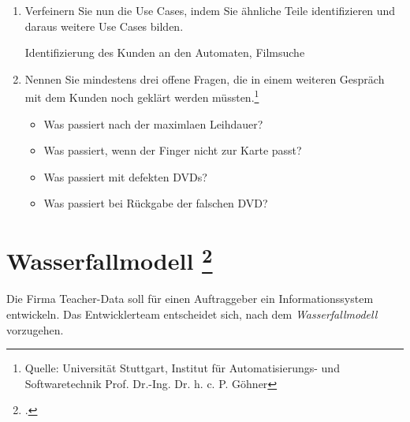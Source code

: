 \documentclass{lehramt-informatik-aufgabe}
\begin{document}
\begin{enumerate}

\item Verfeinern Sie nun die Use Cases, indem Sie ähnliche Teile
identifizieren und daraus weitere Use Cases bilden.

\begin{liAntwort}
Identifizierung des Kunden an den Automaten, Filmsuche
\end{liAntwort}


\item Nennen Sie mindestens drei offene Fragen, die in einem weiteren
Gespräch mit dem Kunden noch geklärt werden müssten.\footnote{Quelle:
Universität Stuttgart, Institut für Automatisierungs- und
Softwaretechnik Prof. Dr.-Ing. Dr. h. c. P. Göhner}

\begin{liAntwort}
\begin{itemize}
\item Was passiert nach der maximlaen Leihdauer?
\item Was passiert, wenn der Finger nicht zur Karte passt?
\item Was passiert mit defekten DVDs?
\item Was passiert bei Rückgabe der falschen DVD?
\end{itemize}
\end{liAntwort}
\end{enumerate}

%

\section{Wasserfallmodell
\footcite[Seite 1]{sosy:ab:1}}

Die Firma Teacher-Data soll für einen Auftraggeber ein
Informationssystem entwickeln. Das Entwicklerteam entscheidet sich, nach
dem \emph{Wasserfallmodell} vorzugehen.
\end{document}
